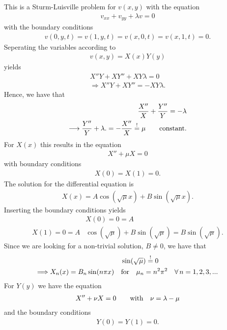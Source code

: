 \documentclass{article}
\begin{document}
This is a Sturm-Luisville problem for $v(x, y)$ with the equation
\begin{align}
    v_{xx} + v_{yy} + \lambda v = 0
\end{align}
with the boundary conditions
\begin{align}
    v(0,y,t) = v(1, y, t) = v(x, 0, t) = v(x, 1, t) = 0.
\end{align}
Seperating the variables according to
\begin{align}
    v(x, y) = X(x) Y(y)
\end{align}
yields
\begin{align}
    X''Y + XY''+ XY\lambda = 0\\
    \Longrightarrow  X''Y + XY''=- XY\lambda .
\end{align}
Hence, we have that
\begin{align}
    \frac{X''}{X} + \frac{Y''}{Y} = -\lambda \\
    \longrightarrow \frac{Y''}{Y} + \lambda. = -\frac{X''}{X} \overset{!}{=} \mu \quad \quad{\rm constant}.
\end{align}
For $X(x)$ this results in the equation
\begin{align}
    X'' + \mu X = 0
\end{align}
with boundary conditions
\begin{align}
    X(0) = X(1) = 0.
\end{align}
The solution for the differential equation is
\begin{align}
    X(x) = A \cos(\sqrt{\mu}x) + B\sin(\sqrt{\mu}x).
\end{align}
Inserting the boundary conditions yields
\begin{align}
    &X(0) = 0 = A \\
    X(1) = 0 = A &\cos(\sqrt{\mu}) + B\sin(\sqrt{\mu}) = B\sin(\sqrt{\mu}).
\end{align}
Since we are looking for a non-trivial solution, $B \neq 0$, we have that
\begin{align}
    &\sin(\sqrt{\mu}) \overset{!}{=} 0 \\
    \Longrightarrow X_n(x) = B_n \sin(n\pi  x) \quad& {\rm for} \quad \mu_n = n^2\pi^2 \quad \forall \,n = 1, 2, 3, ...
\end{align}
For $Y(y)$ we have the equation
\begin{align}
    X'' + \nu X = 0 \quad \quad {\rm with} \quad \nu = \lambda - \mu
\end{align}
and the boundary conditions
\begin{align}
    Y(0) = Y(1) = 0.
\end{align}
\end{document}
